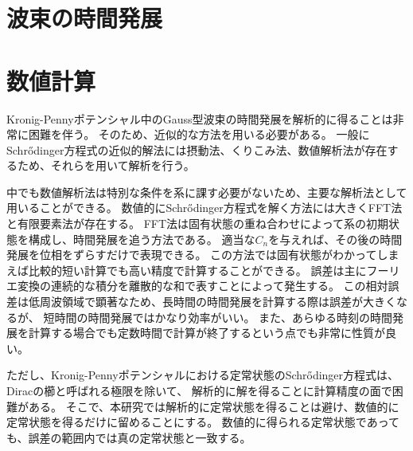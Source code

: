 \documentclass[autodetect-engine,dvipdfmx-if-dvi,ja=standard,a4paper,layout=v2]{bxjsreport}
\begin{document}
    \section{波束の時間発展}
    \section{数値計算}
    Kronig-Pennyポテンシャル中のGauss型波束の時間発展を解析的に得ることは非常に困難を伴う。
    そのため、近似的な方法を用いる必要がある。
    一般にSchrődinger方程式の近似的解法には摂動法、くりこみ法、数値解析法が存在するため、それらを用いて解析を行う。\par
    中でも数値解析法は特別な条件を系に課す必要がないため、主要な解析法として用いることができる。
    数値的にSchrődinger方程式を解く方法には大きくFFT法と有限要素法が存在する。
    FFT法は固有状態の重ね合わせによって系の初期状態を構成し、時間発展を追う方法である。
    適当な$C_{n}$を与えれば、その後の時間発展を位相をずらすだけで表現できる。
    この方法では固有状態がわかってしまえば比較的短い計算でも高い精度で計算することができる。
    誤差は主にフーリエ変換の連続的な積分を離散的な和で表すことによって発生する。
    この相対誤差は低周波領域で顕著なため、長時間の時間発展を計算する際は誤差が大きくなるが、
    短時間の時間発展ではかなり効率がいい。
    また、あらゆる時刻の時間発展を計算する場合でも定数時間で計算が終了するという点でも非常に性質が良い。\par
    ただし、Kronig-Pennyポテンシャルにおける定常状態のSchrődinger方程式は、Diracの櫛と呼ばれる極限を除いて、
    解析的に解を得ることに計算精度の面で困難がある。
    そこで、本研究では解析的に定常状態を得ることは避け、数値的に定常状態を得るだけに留めることにする。
    数値的に得られる定常状態であっても、誤差の範囲内では真の定常状態と一致する。\par
\end{document}
